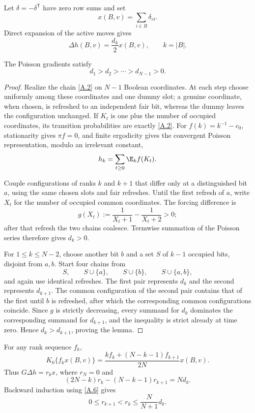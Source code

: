 Let $\delta=-\delta^{\mathsf T}$ have zero row sums and set
\[
 x(B,v)=\sum_{i\in B}\delta_{vi}.                            \tag{A.4}\label{A.4}
\]
Direct expansion of the active moves gives
\[
 \Delta h(B,v)=\frac{d_k}{2}x(B,v),\qquad k=|B|.             \tag{A.5}\label{A.5}
\]
\begin{lemma}\label{lem:rank-gradient}
The Poisson gradients satisfy
\[
 d_1>d_2>\cdots>d_{N-1}>0.                                  \tag{A.6}\label{A.6}
\]
\end{lemma}

\begin{proof}
Realize the chain \eqref{A.2} on $N-1$ Boolean coordinates.  At each step
choose uniformly among these coordinates and one dummy slot; a genuine
coordinate, when chosen, is refreshed to an independent fair bit, whereas
the dummy leaves the configuration unchanged.  If $K_t$ is one plus the
number of occupied coordinates, its transition probabilities are exactly
\eqref{A.2}.  For $f(k)=k^{-1}-c_0$, stationarity gives $\pi f=0$, and finite
ergodicity gives the convergent Poisson representation, modulo an irrelevant
constant,
\[
 h_k=\sum_{t\ge0}\E_k f(K_t).
\]

Couple configurations of ranks $k$ and $k+1$ that differ only at a
distinguished bit $a$, using the same chosen slots and fair refreshes.  Until
the first refresh of $a$, write $X_t$ for the number of occupied common
coordinates.  The forcing difference is
\[
 g(X_t):=\frac1{X_t+1}-\frac1{X_t+2}>0;
\]
after that refresh the two chains coalesce.  Termwise summation of the
Poisson series therefore gives $d_k>0$.

For $1\le k\le N-2$, choose another bit $b$ and a set $S$ of $k-1$
occupied bits, disjoint from $a,b$.  Start four chains from
\[
 S,\qquad S\cup\{a\},\qquad S\cup\{b\},\qquad S\cup\{a,b\},
\]
and again use identical refreshes.  The first pair represents $d_k$ and the
second represents $d_{k+1}$.  The common configuration of the second pair
contains that of the first until $b$ is refreshed, after which the
corresponding common configurations coincide.  Since $g$ is strictly
decreasing, every summand for $d_k$ dominates the corresponding summand for
$d_{k+1}$, and the inequality is strict already at time zero.  Hence
$d_k>d_{k+1}$, proving the lemma.
\end{proof}

For any rank sequence $f_k$,
\[
 K_0\{f_kx(B,v)\}
 =\frac{kf_k+(N-k-1)f_{k+1}}{2N}x(B,v).                      \tag{A.7}\label{A.7}
\]
Thus $G\Delta h=r_kx$, where $r_N=0$ and
\[
 (2N-k)r_k-(N-k-1)r_{k+1}=Nd_k.                             \tag{A.8}\label{A.8}
\]
Backward induction using \eqref{A.6} gives
\[
 0\le r_{k+1}<r_k\le\frac{N}{N+1}d_k.                       \tag{A.9}\label{A.9}
\]

